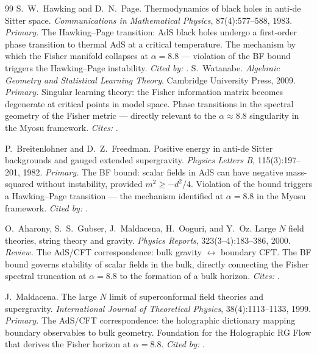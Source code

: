 \documentclass[12pt,a4paper]{article}
\begin{document}
\begin{thebibliography}{99}
S.~W.~Hawking and D.~N.~Page.
\newblock Thermodynamics of black holes in anti-de Sitter space.
\newblock \emph{Communications in Mathematical Physics}, 87(4):577--588, 1983.
\newblock \textit{Primary.} The Hawking--Page transition: AdS black holes undergo a
first-order phase transition to thermal AdS at a critical temperature. The
mechanism by which the Fisher manifold collapses at $\alpha=8.8$ --- violation
of the BF bound triggers the Hawking--Page instability. \textit{Cited by:}
\cite{breitenlohner1982,maldacena1999,witten1998}.
S.~Watanabe.
\newblock \emph{Algebraic Geometry and Statistical Learning Theory}.
\newblock Cambridge University Press, 2009.
\newblock \textit{Primary.} Singular learning theory: the Fisher information matrix becomes
degenerate at critical points in model space. Phase transitions in the spectral
geometry of the Fisher metric --- directly relevant to the $\alpha \approx 8.8$
singularity in the Myosu framework. \textit{Cites:} \cite{amari2000}.

P.~Breitenlohner and D.~Z.~Freedman.
\newblock Positive energy in anti-de Sitter backgrounds and gauged extended supergravity.
\newblock \emph{Physics Letters B}, 115(3):197--201, 1982.
\newblock \textit{Primary.} The BF bound: scalar fields in AdS can have negative mass-squared
without instability, provided $m^2 \geq -d^2/4$. Violation of the bound triggers a
Hawking--Page transition --- the mechanism identified at $\alpha = 8.8$ in the Myosu
framework. \textit{Cited by:} \cite{maldacena1999,ahs1999}.

O.~Aharony, S.~S.~Gubser, J.~Maldacena, H.~Ooguri, and Y.~Oz.
\newblock Large $N$ field theories, string theory and gravity.
\newblock \emph{Physics Reports}, 323(3--4):183--386, 2000.
\newblock \textit{Review.} The AdS/CFT correspondence: bulk gravity $\leftrightarrow$ boundary
CFT. The BF bound governs stability of scalar fields in the bulk, directly connecting
the Fisher spectral truncation at $\alpha=8.8$ to the formation of a bulk horizon.
\textit{Cites:} \cite{maldacena1999,breitenlohner1982,witten1998}.

J.~Maldacena.
\newblock The large $N$ limit of superconformal field theories and supergravity.
\newblock \emph{International Journal of Theoretical Physics}, 38(4):1113--1133, 1999.
\newblock \textit{Primary.} The AdS/CFT correspondence: the holographic dictionary mapping
boundary observables to bulk geometry. Foundation for the Holographic RG Flow that
derives the Fisher horizon at $\alpha=8.8$. \textit{Cited by:} \cite{ahs1999,witten1998}.


\end{thebibliography}
\end{document}
